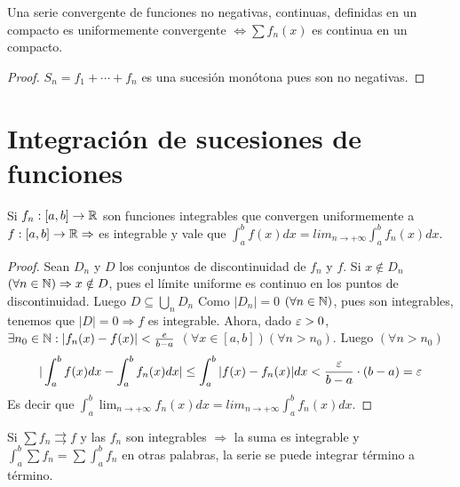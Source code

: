 \begin{corollary}
  Una serie convergente de funciones no negativas, continuas, definidas en un compacto es uniformemente convergente $\iff \sum f_n(x)$ es continua en un compacto.
  \begin{proof}
    $S_n = f_1 + \cdots + f_n$ es una sucesión monótona pues son no negativas.
  \end{proof}
\end{corollary}

\section{Integración de sucesiones de funciones}

\begin{theorem}
  Si $f_n: [a, b] \to \mathbb{R}$ son funciones integrables que convergen uniformemente a $f: [a, b] \to \mathbb{R} \Rightarrow$ es integrable y vale que $\int_a^b f(x) dx = lim_{n \to +\infty} \int_a^b f_n(x) dx$.
  \begin{proof}
    Sean $D_n$ y $D$ los conjuntos de discontinuidad de $f_n$ y $f$. Si $x \notin D_n$ $(\forall n \in \mathbb{N}) \Rightarrow x \notin D$, pues el límite uniforme es continuo en los puntos de discontinuidad. Luego $D \subseteq \bigcup_n D_n$ Como $|D_n| = 0$ $(\forall n \in \mathbb{N})$, pues son integrables, tenemos que $|D| = 0 \Rightarrow f$ es integrable. Ahora, dado $\varepsilon > 0$, $\exists n_0 \in \mathbb{N} : |f_n(x) - f(x)| < \frac{e}{b-a}$ $(\forall x \in [a, b])(\forall n > n_0)$. Luego $(\forall n > n_0)$ \begin{equation} |\int_a^b f(x) dx - \int_a^b f_n(x) dx| \leq \int_a^b |f(x) - f_n(x)|dx < \frac{\varepsilon}{b-a} \cdot (b-a) = \varepsilon
    \end{equation}
    Es decir que $\int_a^b \lim_{n \to +\infty} f_n(x) dx = lim_{n \to +\infty} \int_a^b f_n(x) dx$.
  \end{proof}
\end{theorem}

\begin{corollary}
  Si $\sum f_n \rightrightarrows f$ y las $f_n$ son integrables $\Rightarrow$ la suma es integrable y $\int_a^b \sum f_n = \sum \int_a^b f_n$ en otras palabras, la serie se puede integrar término a término.
\end{corollary}

